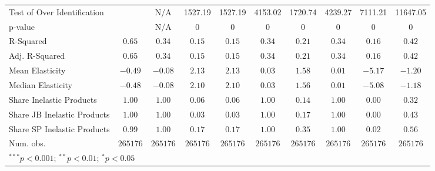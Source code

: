 \begin{tabular}{l c c c c c c c c c}
Test of Over Identification &               & N/A           & 1527.19       & 1527.19       & 4153.02       & 1720.74       & 4239.27       & 7111.21       & 11647.05      \\
p-value                     &               & N/A           & 0             & 0             & 0             & 0             & 0             & 0             & 0             \\
R-Squared                   & $0.65$        & $0.34$        & $0.15$        & $0.15$        & $0.34$        & $0.21$        & $0.34$        & $0.16$        & $0.42$        \\
Adj. R-Squared              & $0.65$        & $0.34$        & $0.15$        & $0.15$        & $0.34$        & $0.21$        & $0.34$        & $0.16$        & $0.42$        \\
Mean Elasticity             & $-0.49$       & $-0.08$       & $2.13$        & $2.13$        & $0.03$        & $1.58$        & $0.01$        & $-5.17$       & $-1.20$       \\
Median Elasticity           & $-0.48$       & $-0.08$       & $2.10$        & $2.10$        & $0.03$        & $1.56$        & $0.01$        & $-5.08$       & $-1.18$       \\
Share Inelastic Products    & $1.00$        & $1.00$        & $0.06$        & $0.06$        & $1.00$        & $0.14$        & $1.00$        & $0.00$        & $0.32$        \\
Share JB Inelastic Products & $1.00$        & $1.00$        & $0.03$        & $0.03$        & $1.00$        & $0.17$        & $1.00$        & $0.00$        & $0.43$        \\
Share SP Inelastic Products & $0.99$        & $1.00$        & $0.17$        & $0.17$        & $1.00$        & $0.35$        & $1.00$        & $0.02$        & $0.56$        \\
Num. obs.                   & $265176$      & $265176$      & $265176$      & $265176$      & $265176$      & $265176$      & $265176$      & $265176$      & $265176$      \\
\bottomrule
\multicolumn{10}{l}{\scriptsize{$^{***}p<0.001$; $^{**}p<0.01$; $^{*}p<0.05$}}
\end{tabular}
